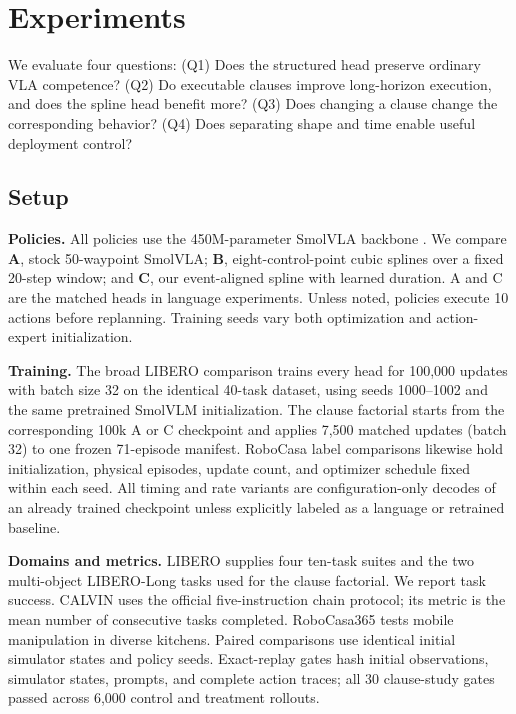 \section{Experiments}
\label{sec:experiments}

We evaluate four questions: (Q1) Does the structured head preserve ordinary VLA competence? (Q2) Do executable clauses improve long-horizon execution, and does the spline head benefit more? (Q3) Does changing a clause change the corresponding behavior? (Q4) Does separating shape and time enable useful deployment control?

\subsection{Setup}

\textbf{Policies.} All policies use the 450M-parameter SmolVLA backbone \cite{shukor2025smolvla}. We compare \textbf{A}, stock 50-waypoint SmolVLA; \textbf{B}, eight-control-point cubic splines over a fixed 20-step window; and \textbf{C}, our event-aligned spline with learned duration. A and C are the matched heads in language experiments. Unless noted, policies execute 10 actions before replanning. Training seeds vary both optimization and action-expert initialization.

\textbf{Training.} The broad LIBERO comparison trains every head for 100,000 updates with batch size 32 on the identical 40-task dataset, using seeds 1000--1002 and the same pretrained SmolVLM initialization. The clause factorial starts from the corresponding 100k A or C checkpoint and applies 7,500 matched updates (batch 32) to one frozen 71-episode manifest. RoboCasa label comparisons likewise hold initialization, physical episodes, update count, and optimizer schedule fixed within each seed. All timing and rate variants are configuration-only decodes of an already trained checkpoint unless explicitly labeled as a language or retrained baseline.

\textbf{Domains and metrics.} LIBERO \cite{liu2023libero} supplies four ten-task suites and the two multi-object LIBERO-Long tasks used for the clause factorial. We report task success. CALVIN \cite{mees2022calvin} uses the official five-instruction chain protocol; its metric is the mean number of consecutive tasks completed. RoboCasa365 \cite{nasiriany2026robocasa365} tests mobile manipulation in diverse kitchens. Paired comparisons use identical initial simulator states and policy seeds. Exact-replay gates hash initial observations, simulator states, prompts, and complete action traces; all 30 clause-study gates passed across 6,000 control and treatment rollouts.

